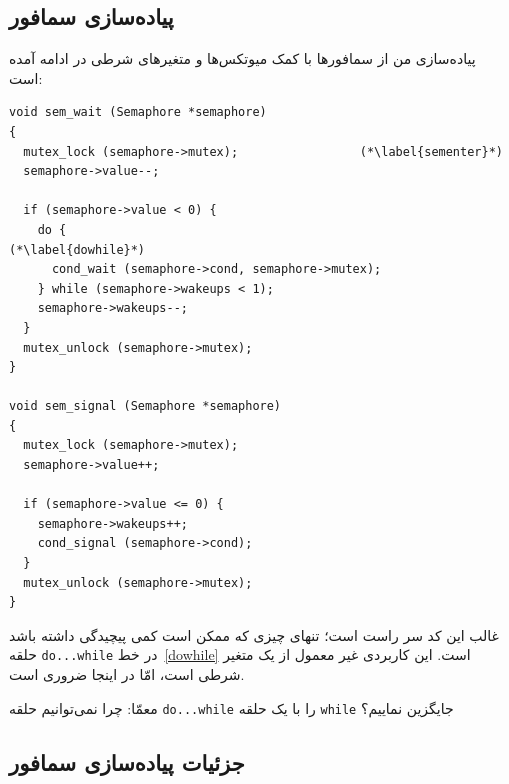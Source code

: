 \documentclass{book}
\newcommand{\clearemptydoublepage}{\newpage\cleardoublepage}
\begin{document}
\subsection{پیاده‌سازی سمافور}

    پیاده‌سازی من از سمافورها با کمک میوتکس‌ها و متغیرهای شرطی  در ادامه آمده است:

\begin{latin}
\begin{lstlisting}
void sem_wait (Semaphore *semaphore)
{
  mutex_lock (semaphore->mutex);                 (*\label{sementer}*)
  semaphore->value--;

  if (semaphore->value < 0) {
    do {                                                (*\label{dowhile}*)
      cond_wait (semaphore->cond, semaphore->mutex);
    } while (semaphore->wakeups < 1);
    semaphore->wakeups--;
  }
  mutex_unlock (semaphore->mutex);
}

void sem_signal (Semaphore *semaphore)
{
  mutex_lock (semaphore->mutex);
  semaphore->value++;

  if (semaphore->value <= 0) {
    semaphore->wakeups++;
    cond_signal (semaphore->cond);
  }
  mutex_unlock (semaphore->mutex);
}
\end{lstlisting}
\end{latin}

    غالب این کد سر راست است؛ تنهای چیزی که ممکن است کمی پیچیدگی داشته باشد حلقه {\tt do...while} در خط~\ref{dowhile} است. 
    این کاربردی غیر معمول از یک متغیر شرطی است، امّا در اینجا ضروری است. 

    معمّا: چرا نمی‌توانیم حلقه {\tt do...while} را با یک حلقه {\tt while}  جایگزین نماییم؟

\clearemptydoublepage
\subsection{جزئیات پیاده‌سازی سمافور}
\end{document}
